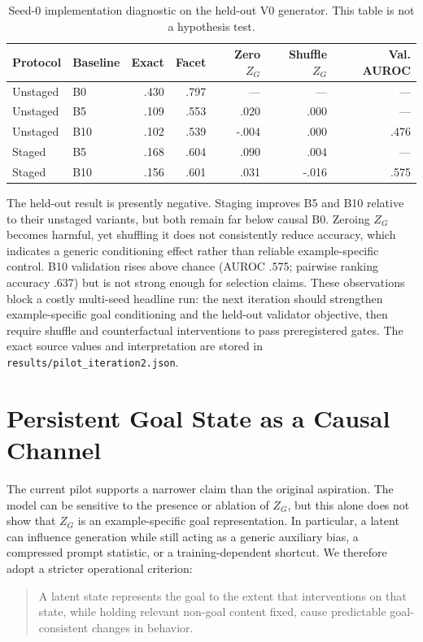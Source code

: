 \documentclass[11pt]{article}
\begin{document}
\begin{table}[ht]
\centering
\begin{tabular}{llrrrrr}\toprule
Protocol & Baseline & Exact & Facet & Zero $Z_G$ & Shuffle $Z_G$ & Val. AUROC\\\midrule
Unstaged & B0  & .430 & .797 & ---   & ---    & ---\\
Unstaged & B5  & .109 & .553 & .020  & .000   & ---\\
Unstaged & B10 & .102 & .539 & -.004 & .000   & .476\\
Staged   & B5  & .168 & .604 & .090  & .004   & ---\\
Staged   & B10 & .156 & .601 & .031  & -.016  & .575\\\bottomrule
\end{tabular}
\caption{Seed-0 implementation diagnostic on the held-out V0 generator. This table is not a hypothesis test.}
\label{tab:pilot-diagnostic}
\end{table}

The held-out result is presently negative. Staging improves B5 and B10 relative to their unstaged variants, but both remain far below causal B0. Zeroing $Z_G$ becomes harmful, yet shuffling it does not consistently reduce accuracy, which indicates a generic conditioning effect rather than reliable example-specific control. B10 validation rises above chance (AUROC .575; pairwise ranking accuracy .637) but is not strong enough for selection claims. These observations block a costly multi-seed headline run: the next iteration should strengthen example-specific goal conditioning and the held-out validator objective, then require shuffle and counterfactual interventions to pass preregistered gates. The exact source values and interpretation are stored in \texttt{results/pilot\_iteration2.json}.

\section{Persistent Goal State as a Causal Channel}
The current pilot supports a narrower claim than the original aspiration. The model can be sensitive to the presence or ablation of $Z_G$, but this alone does not show that $Z_G$ is an example-specific goal representation. In particular, a latent can influence generation while still acting as a generic auxiliary bias, a compressed prompt statistic, or a training-dependent shortcut. We therefore adopt a stricter operational criterion:
\begin{quote}
A latent state represents the goal to the extent that interventions on that state, while holding relevant non-goal content fixed, cause predictable goal-consistent changes in behavior.
\end{quote}
\end{document}

